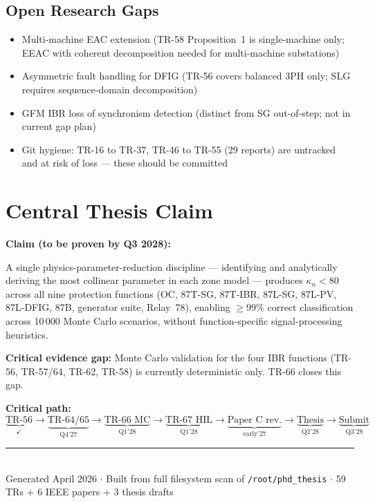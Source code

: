 \documentclass[11pt,a4paper]{article}
\begin{document}
\subsection{Open Research Gaps}

\begin{itemize}
  \item Multi-machine EAC extension (TR-58 Proposition~1 is single-machine only;
    EEAC with coherent decomposition needed for multi-machine substations)
  \item Asymmetric fault handling for DFIG (TR-56 covers balanced 3PH only;
    SLG requires sequence-domain decomposition)
  \item GFM IBR loss of synchronism detection (distinct from SG out-of-step;
    not in current gap plan)
  \item Git hygiene: TR-16 to TR-37, TR-46 to TR-55 (29 reports) are untracked
    and at risk of loss — these should be committed
\end{itemize}

\newpage
\section{Central Thesis Claim}

\begin{mdframed}[backgroundcolor=lightgray,linecolor=alertred,linewidth=1.5pt,
  innerleftmargin=10pt,innerrightmargin=10pt,innertopmargin=8pt,innerbottommargin=8pt]
\textbf{Claim (to be proven by Q3 2028):}

A single physics-parameter-reduction discipline — identifying and analytically
deriving the most collinear parameter in each zone model — produces
$\kappa_n < 80$ across all nine protection functions
(OC, 87T-SG, 87T-IBR, 87L-SG, 87L-PV, 87L-DFIG, 87B, generator suite,
Relay~78), enabling $\geq 99\%$ correct classification across 10\,000 Monte
Carlo scenarios, without function-specific signal-processing heuristics.
\end{mdframed}

\bigskip

\textbf{Critical evidence gap:} Monte Carlo validation for the four IBR
functions (TR-56, TR-57/64, TR-62, TR-58) is currently deterministic only.
TR-66 closes this gap.

\textbf{Critical path:}
\[
  \underbrace{\text{TR-56}}_{\checkmark}
  \to \underbrace{\text{TR-64/65}}_{\text{Q4'27}}
  \to \underbrace{\text{TR-66 MC}}_{\text{Q1'28}}
  \to \underbrace{\text{TR-67 HIL}}_{\text{Q1'28}}
  \to \underbrace{\text{Paper C rev.}}_{\text{early'27}}
  \to \underbrace{\text{Thesis}}_{\text{Q2'28}}
  \to \underbrace{\text{Submit}}_{\text{Q3'28}}
\]

\vfill
\begin{center}
\rule{0.6\linewidth}{0.4pt}\\[4pt]
{\small Generated April 2026 $\cdot$ Built from full filesystem scan of
\texttt{/root/phd\_thesis} $\cdot$ 59 TRs + 6 IEEE papers + 3 thesis drafts}
\end{center}
\end{document}
